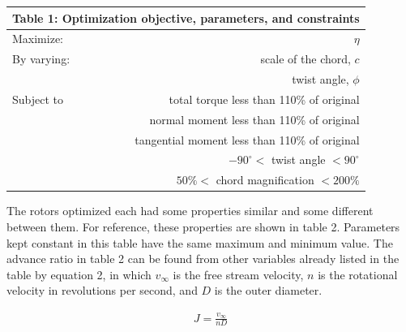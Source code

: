 \documentclass[journal ]{new-aiaa}
\begin{document}
\begin{center}
\begin{tabular}{l  r}
	 \multicolumn{2}{c}{Table 1: Optimization objective, parameters, and constraints}  \\ \hline
  	Maximize: & $\eta$ \\ \hline
  	By varying: & scale of the chord, $c$ \\ 
  	 & twist angle, $\phi$ \\  \hline
  	Subject to & total torque less than 110\% of original \\ 
	 & normal moment less than 110\% of original \\ 
	 & tangential moment less than 110\% of original \\ 
	 & $-90^{\circ} <$ twist angle $< 90^{\circ}$ \\
	 & $50\% <$ chord magnification $< 200\% $ \\ \hline
\end{tabular}
\end{center}

The rotors optimized each had some properties similar and some different between them. For reference, these properties are shown in table 2. Parameters kept constant in this table have the same maximum and minimum value. The advance ratio in table 2 can be found from other variables already listed in the table by equation 2, in which $v_{\infty}$ is the free stream velocity, $n$ is the rotational velocity in revolutions per second, and $D$ is the outer diameter.

\begin{equation}
	\begin{aligned}
	\label{equation:2}
	J = \frac{v_{\infty}}{n D}
	\end{aligned}
\end{equation}
\end{document}
